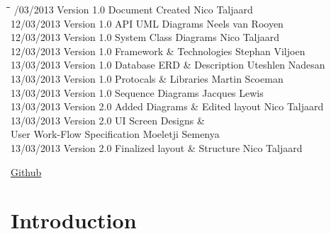 \documentclass[12pt]{article}
\begin{document}
\begin{tabbing}
\hspace*{2.5cm}\=\hspace*{2.5cm}\=\hspace*{7cm}\=\hspace*{3cm} /03/2013 \> Version 1.0 \> Document Created \> Nico Taljaard\\
12/03/2013 \> Version 1.0 \> API UML Diagrams \> Neels van Rooyen\\
12/03/2013 \> Version 1.0 \> System Class Diagrams \> Nico Taljaard\\
12/03/2013 \> Version 1.0 \> Framework \& Technologies \> Stephan Viljoen\\
13/03/2013 \> Version 1.0 \> Database ERD \& Description \> Uteshlen Nadesan\\
13/03/2013 \> Version 1.0 \> Protocals \& Libraries \> Martin Scoeman\\
13/03/2013 \> Version 1.0 \> Sequence Diagrams \> Jacques Lewis\\
13/03/2013 \> Version 2.0 \> Added Diagrams \& Edited layout \> Nico Taljaard\\
13/03/2013 \> Version 2.0 \> UI Screen Designs \&  \>\\
						\>\> User Work-Flow Specification \> Moeletji Semenya\\
13/03/2013 \> Version 2.0 \> Finalized layout \& Structure \> Nico Taljaard\\

\end{tabbing}

\newpage


\hypersetup{linktocpage}
\tableofcontents

\vspace{1.0cm}
\href{https://github.com/njTaljaard/Cos301_Phase2/}{Github}

\newpage


\section{Introduction}
\end{document}
